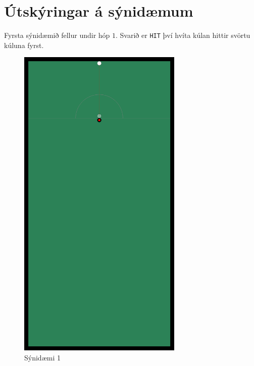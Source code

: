 \section*{Útskýringar á sýnidæmum}
Fyrsta sýnidæmið fellur undir hóp $1$. Svarið er \texttt{HIT} því hvíta kúlan hittir svörtu kúluna fyrst.
\begin{figure}[ht!]
  \centering
    \includegraphics[width=0.7\textwidth]{sample1}
  \caption{Sýnidæmi 1}
\end{figure}


